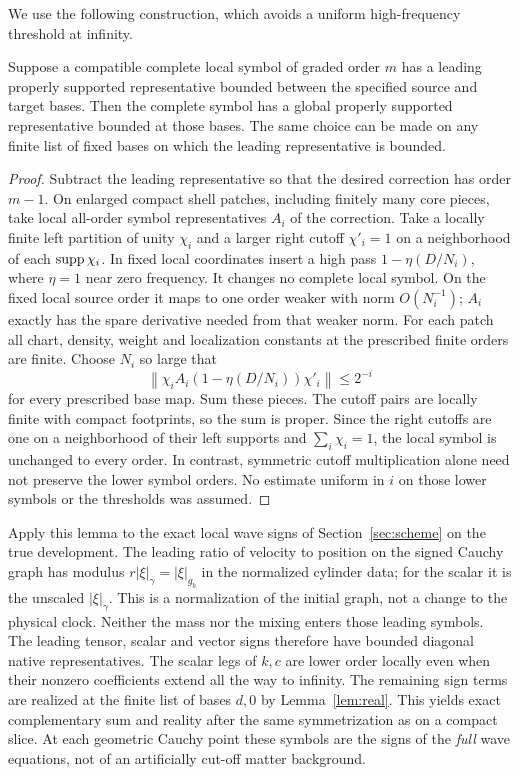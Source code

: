 We use the following construction, which avoids a uniform high-frequency threshold at infinity.
\begin{lemma}\label{lem:real}
Suppose a compatible complete local symbol of graded order \(m\) has a leading properly supported representative bounded between the specified source and target bases. Then the complete symbol has a global properly supported representative bounded at those bases. The same choice can be made on any finite list of fixed bases on which the leading representative is bounded.
\end{lemma}
\begin{proof}
Subtract the leading representative so that the desired correction has order \(m-1\). On enlarged compact shell patches, including finitely many core pieces, take local all-order symbol representatives \(A_i\) of the correction. Take a locally finite left partition of unity \(\chi_i\) and a larger right cutoff \(\chi'_i=1\) on a neighborhood of each \(\operatorname{supp} \chi_i\). In fixed local coordinates insert a high pass \(1-\eta(D/N_i)\), where \(\eta=1\) near zero frequency. It changes no complete local symbol. On the fixed local source order it maps to one order weaker with norm \(O(N_i^{-1})\); \(A_i\) exactly has the spare derivative needed from that weaker norm. For each patch all chart, density, weight and localization constants at the prescribed finite orders are finite. Choose \(N_i\) so large that
\[
  \left\|\chi_i A_i (1-\eta(D/N_i))\chi'_i\right\|\leq 2^{-i}
\]
for every prescribed base map. Sum these pieces. The cutoff pairs are locally finite with compact footprints, so the sum is proper. Since the right cutoffs are one on a neighborhood of their left supports and \(\sum_i\chi_i=1\), the local symbol is unchanged to every order. In contrast, symmetric cutoff multiplication alone need not preserve the lower symbol orders. No estimate uniform in \(i\) on those lower symbols or the thresholds was assumed.
\end{proof}

Apply this lemma to the exact local wave signs of Section~\ref{sec:scheme} on the true development. The leading ratio of velocity to position on the signed Cauchy graph has modulus \(r|\xi|_\gamma=|\xi|_{g_b}\) in the normalized cylinder data; for the scalar it is the unscaled \(|\xi|_\gamma\). This is a normalization of the initial graph, not a change to the physical clock. Neither the mass nor the mixing enters those leading symbols. The leading tensor, scalar and vector signs therefore have bounded diagonal native representatives. The scalar legs of \(k,c\) are lower order locally even when their nonzero coefficients extend all the way to infinity. The remaining sign terms are realized at the finite list of bases \(d,0\) by Lemma~\ref{lem:real}. This yields exact complementary sum and reality after the same symmetrization as on a compact slice. At each geometric Cauchy point these symbols are the signs of the \emph{full} wave equations, not of an artificially cut-off matter background.

